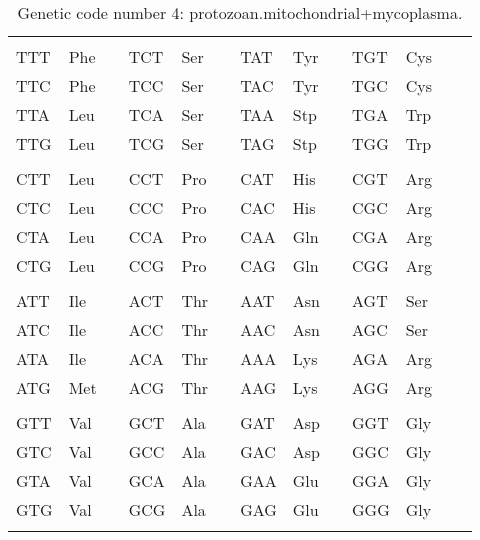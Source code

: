 \begin{table}
\begin{center}
\begin{tabular}{*{13}{l}}
\hline
\\
TTT & Phe &  &
TCT & Ser &  &
TAT & Tyr &  &
TGT & Cys &  &
\\
TTC & Phe &  &
TCC & Ser &  &
TAC & Tyr &  &
TGC & Cys &  &
\\
TTA & Leu &  &
TCA & Ser &  &
TAA & Stp &  &
TGA & Trp &  &
\\
TTG & Leu &  &
TCG & Ser &  &
TAG & Stp &  &
TGG & Trp &  &
\\
\\
CTT & Leu &  &
CCT & Pro &  &
CAT & His &  &
CGT & Arg &  &
\\
CTC & Leu &  &
CCC & Pro &  &
CAC & His &  &
CGC & Arg &  &
\\
CTA & Leu &  &
CCA & Pro &  &
CAA & Gln &  &
CGA & Arg &  &
\\
CTG & Leu &  &
CCG & Pro &  &
CAG & Gln &  &
CGG & Arg &  &
\\
\\
ATT & Ile &  &
ACT & Thr &  &
AAT & Asn &  &
AGT & Ser &  &
\\
ATC & Ile &  &
ACC & Thr &  &
AAC & Asn &  &
AGC & Ser &  &
\\
ATA & Ile &  &
ACA & Thr &  &
AAA & Lys &  &
AGA & Arg &  &
\\
ATG & Met &  &
ACG & Thr &  &
AAG & Lys &  &
AGG & Arg &  &
\\
\\
GTT & Val &  &
GCT & Ala &  &
GAT & Asp &  &
GGT & Gly &  &
\\
GTC & Val &  &
GCC & Ala &  &
GAC & Asp &  &
GGC & Gly &  &
\\
GTA & Val &  &
GCA & Ala &  &
GAA & Glu &  &
GGA & Gly &  &
\\
GTG & Val &  &
GCG & Ala &  &
GAG & Glu &  &
GGG & Gly &  &
\\
\\
\hline
\end{tabular}
\caption{Genetic code number 4: protozoan.mitochondrial+mycoplasma.}
\label{code4.tex}
\end{center}
\end{table}
